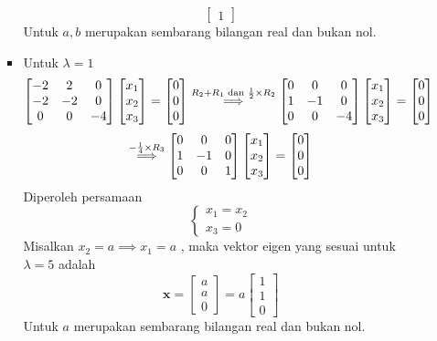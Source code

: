 \documentclass[12pt,A4paper]{article}
\begin{document}
\begin{enumerate}
\begin{enumerate}
\begin{itemize}
\[\begin{bmatrix}
1
\end{bmatrix} \]
Untuk $a,b$ merupakan sembarang bilangan real dan bukan nol.
\item Untuk $\lambda = 1$
\[\begin{bmatrix}
-2 & 2 & 0 \\
-2 & -2 & 0 \\
0 & 0 & -4
\end{bmatrix}  \begin{bmatrix}
x_1 \\
x_2 \\
x_3
\end{bmatrix} = \begin{bmatrix}
0 \\
 0\\
0
\end{bmatrix} \buildrel R_2 + R_1 \text{ dan } \frac{1}{2} \times R_2 \over  \implies \begin{bmatrix}
0 & 0 & 0 \\
1 & -1 & 0 \\
0 & 0 & -4
\end{bmatrix}  \begin{bmatrix}
x_1 \\
x_2 \\
x_3
\end{bmatrix} = \begin{bmatrix}
0 \\
 0\\
0
\end{bmatrix}\]
\[ \buildrel  -\frac{1}{4} \times R_3 \over  \implies 
\begin{bmatrix}
0 & 0 & 0 \\
1 & -1 & 0 \\
0 & 0 & 1
\end{bmatrix}  \begin{bmatrix}
x_1 \\
x_2 \\
x_3
\end{bmatrix} = \begin{bmatrix}
0 \\
 0\\
0
\end{bmatrix}\]
Diperoleh persamaan
\[ \begin{cases}
x_1 = x_2 \\
x_3 = 0
\end{cases}\]
Misalkan $x_2 = a \implies x_1 = a$ , maka vektor eigen yang sesuai untuk $\lambda = 5$ adalah
\[\mathbf{x} = \begin{bmatrix}
a \\
a\\
0
\end{bmatrix} =  a
\begin{bmatrix}
1 \\
1\\
0
\end{bmatrix}  \]
Untuk $a$ merupakan sembarang bilangan real dan bukan nol.
    \end{itemize}
\end{enumerate}
\end{enumerate}
\end{document}
